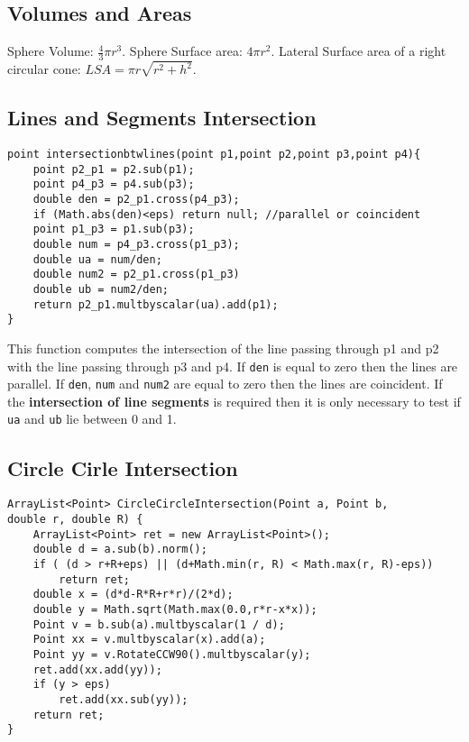 \documentclass[10pt,letterpaper,twocolumn,twosided]{article}
\begin{document}
\subsection{Volumes and Areas}

Sphere Volume: $\frac{4}{3} \pi r^3$. Sphere Surface area: $4 \pi r^2$.
Lateral Surface area of a right circular cone: $LSA = \pi  r  \sqrt{r^2 + h^2}$.
  
\subsection{Lines and Segments Intersection}


\begin{lstlisting}
point intersectionbtwlines(point p1,point p2,point p3,point p4){
    point p2_p1 = p2.sub(p1);
    point p4_p3 = p4.sub(p3);
    double den = p2_p1.cross(p4_p3);
    if (Math.abs(den)<eps) return null; //parallel or coincident 
    point p1_p3 = p1.sub(p3);
    double num = p4_p3.cross(p1_p3);
    double ua = num/den;
    double num2 = p2_p1.cross(p1_p3)
    double ub = num2/den;
    return p2_p1.multbyscalar(ua).add(p1);
}
\end{lstlisting}

This function computes the intersection of the line passing through p1 and p2 with the line passing through p3 and p4. If \verb+den+ is equal to zero then the lines are parallel. If \verb+den+, \verb+num+ and \verb+num2+ are equal to zero then the lines are coincident. If the \textbf{intersection of line segments} is required then it is only necessary to test if \verb+ua+ and \verb+ub+ lie between 0 and 1.

\subsection{Circle Cirle Intersection}

\begin{lstlisting}
ArrayList<Point> CircleCircleIntersection(Point a, Point b, 
double r, double R) {
    ArrayList<Point> ret = new ArrayList<Point>();
    double d = a.sub(b).norm();
    if ( (d > r+R+eps) || (d+Math.min(r, R) < Math.max(r, R)-eps)) 
        return ret;
    double x = (d*d-R*R+r*r)/(2*d);
    double y = Math.sqrt(Math.max(0.0,r*r-x*x));
    Point v = b.sub(a).multbyscalar(1 / d);
    Point xx = v.multbyscalar(x).add(a);
    Point yy = v.RotateCCW90().multbyscalar(y);
    ret.add(xx.add(yy));
    if (y > eps)
        ret.add(xx.sub(yy));
    return ret;
}
\end{lstlisting}
\end{document}
